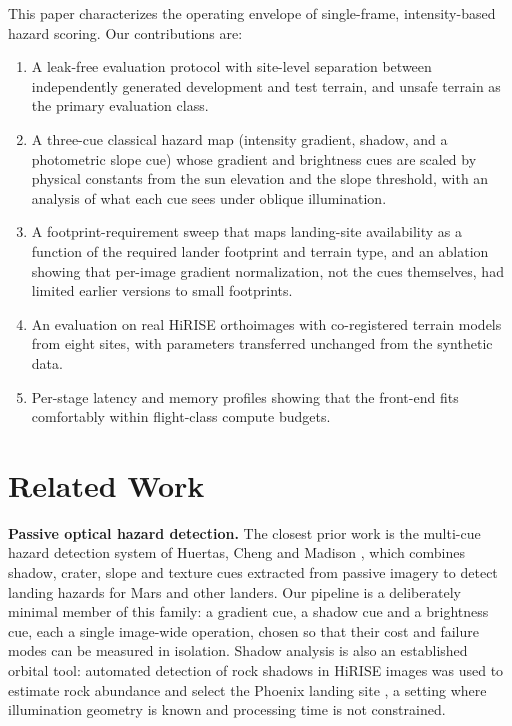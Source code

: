 \documentclass{article}
\begin{document}
This paper characterizes the operating envelope of single-frame, intensity-based hazard scoring. Our contributions are:
\begin{enumerate}
    \item A leak-free evaluation protocol with site-level separation between independently generated development and test terrain, and unsafe terrain as the primary evaluation class.
    \item A three-cue classical hazard map (intensity gradient, shadow, and a photometric slope cue) whose gradient and brightness cues are scaled by physical constants from the sun elevation and the slope threshold, with an analysis of what each cue sees under oblique illumination.
    \item A footprint-requirement sweep that maps landing-site availability as a function of the required lander footprint and terrain type, and an ablation showing that per-image gradient normalization, not the cues themselves, had limited earlier versions to small footprints.
    \item An evaluation on real HiRISE orthoimages with co-registered terrain models from eight sites, with parameters transferred unchanged from the synthetic data.
    \item Per-stage latency and memory profiles showing that the front-end fits comfortably within flight-class compute budgets.
\end{enumerate}

\section{Related Work}
\label{sec:related}

\textbf{Passive optical hazard detection.} The closest prior work is the multi-cue hazard detection system of Huertas, Cheng and Madison \cite{huertas2006passive}, which combines shadow, crater, slope and texture cues extracted from passive imagery to detect landing hazards for Mars and other landers. Our pipeline is a deliberately minimal member of this family: a gradient cue, a shadow cue and a brightness cue, each a single image-wide operation, chosen so that their cost and failure modes can be measured in isolation. Shadow analysis is also an established orbital tool: automated detection of rock shadows in HiRISE images was used to estimate rock abundance and select the Phoenix landing site \cite{golombek2008rocks}, a setting where illumination geometry is known and processing time is not constrained.
\end{document}
